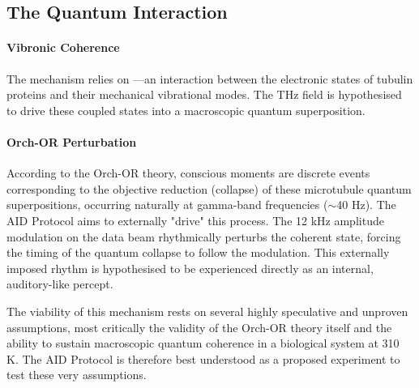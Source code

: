 \subsection{The Quantum Interaction}

\paragraph{Vibronic Coherence}
The mechanism relies on —an interaction between the electronic states of tubulin proteins and their mechanical vibrational modes. The THz field is hypothesised to drive these coupled states into a macroscopic quantum superposition.

\paragraph{Orch-OR Perturbation}
According to the Orch-OR theory, conscious moments are discrete events corresponding to the objective reduction (collapse) of these microtubule quantum superpositions, occurring naturally at gamma-band frequencies ($\sim$40 Hz). The AID Protocol aims to externally "drive" this process. The 12 kHz amplitude modulation on the data beam rhythmically perturbs the coherent state, forcing the timing of the quantum collapse to follow the modulation. This externally imposed rhythm is hypothesised to be experienced directly as an internal, auditory-like percept.

\begin{warningbox}
    The viability of this mechanism rests on several highly speculative and unproven assumptions, most critically the validity of the Orch-OR theory itself and the ability to sustain macroscopic quantum coherence in a biological system at 310 K. The AID Protocol is therefore best understood as a proposed experiment to test these very assumptions.
\end{warningbox}


